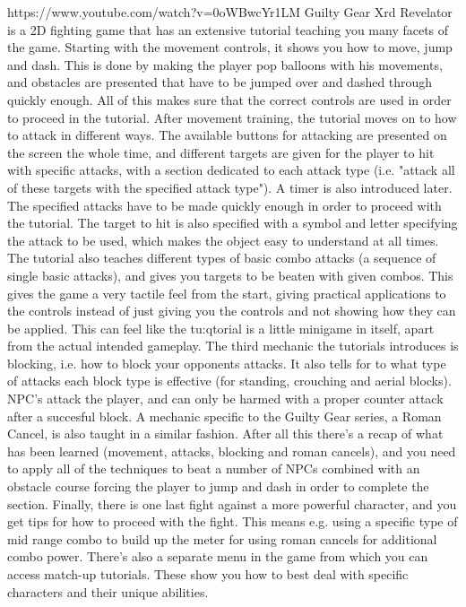 https://www.youtube.com/watch?v=0oWBwcYr1LM
Guilty Gear Xrd Revelator is a 2D fighting game that has an extensive tutorial
teaching you many facets of the game. Starting with the movement controls, it
shows you how to move, jump and dash. This is done by making the player pop
balloons with his movements, and obstacles are presented that have to be
jumped over and dashed through quickly enough. All of this makes sure that the correct controls are used in
order to proceed in the tutorial.
After movement training, the tutorial moves on to how to attack in different
ways. The available buttons for attacking are presented on the screen the
whole time, and different targets are given for the player to hit with
specific attacks, with a section dedicated to each attack type (i.e. "attack
all of these targets with the specified attack type"). A timer is also
introduced later. The specified attacks have to be made quickly enough in
order to proceed with the tutorial. The target to hit is also specified with a
symbol and letter specifying the attack to be used, which makes the object
easy to understand at all times. The tutorial also teaches different types of
basic combo attacks (a sequence of single basic attacks), and gives you targets to be beaten with given combos.
This gives the game a very tactile feel from the start, giving practical
applications to the controls instead of just giving you the controls and not
showing how they can be applied. This can feel like the tu:qtorial is a little
minigame in itself, apart from the actual intended gameplay.
The third mechanic the tutorials introduces is blocking, i.e. how to block
your opponents attacks. It also tells for to what type of attacks each block
type is effective (for standing, crouching and aerial blocks). NPC's attack
the player, and can only be harmed with a proper counter attack after a
succesful block. A mechanic specific to the Guilty Gear series, a Roman
Cancel, is also taught in a similar fashion.
After all this there's a recap of what has been learned (movement, attacks,
blocking and roman cancels), and you need to apply all of the techniques to
beat a number of NPCs combined with an obstacle course forcing the player to
jump and dash in order to complete the section. Finally, there is one last
fight against a more powerful character, and you get tips for how to proceed
with the fight. This means e.g. using a specific type of mid range combo to
build up the meter for using roman cancels for additional combo power.
There's also a separate menu in the game from which you can access match-up
tutorials. These show you how to best deal with specific characters and their
unique abilities.

